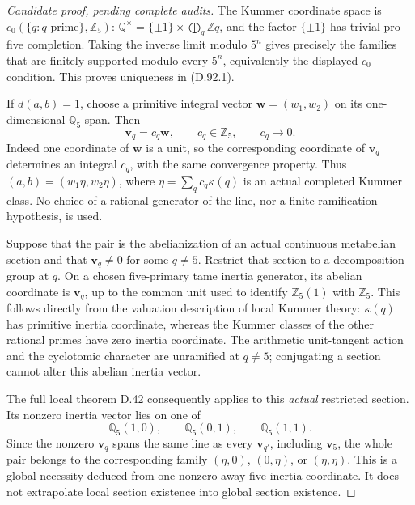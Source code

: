 \begin{proof}[Candidate proof, pending complete audits]
The Kummer coordinate space is
\(c_0(\{q:q\text{ prime}\},\mathbb Z_5)\):
\(\mathbb Q^\times=\{\pm1\}\times\bigoplus_q\mathbb Z q\),
and the factor \(\{\pm1\}\) has trivial pro-five
completion. Taking the inverse limit modulo \(5^n\)
gives precisely the families that are finitely supported
modulo every \(5^n\), equivalently the displayed \(c_0\)
condition. This proves uniqueness in (D.92.1).

If \(d(a,b)=1\), choose a primitive integral vector
\(\mathbf w=(w_1,w_2)\) on its one-dimensional
\(\mathbb Q_5\)-span. Then
\[
                  \mathbf v_q=c_q\mathbf w,
                   \qquad c_q\in\mathbb Z_5,
                   \qquad c_q\longrightarrow0.                \tag{D.92.6}
\]
Indeed one coordinate of \(\mathbf w\) is a unit,
so the corresponding coordinate of \(\mathbf v_q\)
determines an integral \(c_q\), with the same convergence
property. Thus \((a,b)=(w_1\eta,w_2\eta)\), where
\(\eta=\sum_qc_q\kappa(q)\) is an actual completed
Kummer class. No choice of a rational generator of the
line, nor a finite ramification hypothesis, is used.

Suppose that the pair is the abelianization of an actual
continuous metabelian section and that
\(\mathbf v_q\ne0\) for some \(q\ne5\).
Restrict that section to a decomposition group at \(q\).
On a chosen five-primary tame inertia generator, its
abelian coordinate is \(\mathbf v_q\), up to the common
unit used to identify \(\mathbb Z_5(1)\) with \(\mathbb Z_5\).
This follows directly from the valuation description of
local Kummer theory: \(\kappa(q)\) has primitive inertia
coordinate, whereas the Kummer classes of the other
rational primes have zero inertia coordinate. The
arithmetic unit-tangent action and the cyclotomic character
are unramified at \(q\ne5\); conjugating a section cannot
alter this abelian inertia vector.

The full local theorem D.42 consequently applies to this
\emph{actual} restricted section. Its nonzero inertia vector
lies on one of
\[
          \mathbb Q_5(1,0),\qquad
          \mathbb Q_5(0,1),\qquad
          \mathbb Q_5(1,1).                                  \tag{D.92.7}
\]
Since the nonzero \(\mathbf v_q\) spans the same line as
every \(\mathbf v_{q'}\), including \(\mathbf v_5\),
the whole pair belongs to the corresponding family
\((\eta,0)\), \((0,\eta)\), or \((\eta,\eta)\).
This is a global necessity deduced from one nonzero
away-five inertia coordinate. It does not extrapolate
local section existence into global section existence.


\end{proof}

